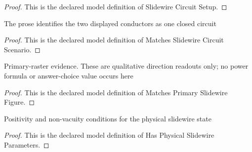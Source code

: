 \begin{proof}
  This is the declared model definition of Slidewire Circuit Setup.
\end{proof}
\begin{definition}
  \label{def:physics:phyx-mini-0919:phyxminiproblems-problemphyxmini0919-matchesslidewirecircuitscenario}
  The prose identifies the two displayed conductors as one closed circuit
\end{definition}
\begin{proof}
  This is the declared model definition of Matches Slidewire Circuit Scenario.
\end{proof}
\begin{definition}
  \label{def:physics:phyx-mini-0919:phyxminiproblems-problemphyxmini0919-matchesprimaryslidewirefigure}
  Primary-raster evidence. These are qualitative direction readouts only; no power formula or answer-choice value occurs here
\end{definition}
\begin{proof}
  This is the declared model definition of Matches Primary Slidewire Figure.
\end{proof}
\begin{definition}
  \label{def:physics:phyx-mini-0919:phyxminiproblems-problemphyxmini0919-hasphysicalslidewireparameters}
  Positivity and non-vacuity conditions for the physical slidewire state
\end{definition}
\begin{proof}
  This is the declared model definition of Has Physical Slidewire Parameters.
\end{proof}
